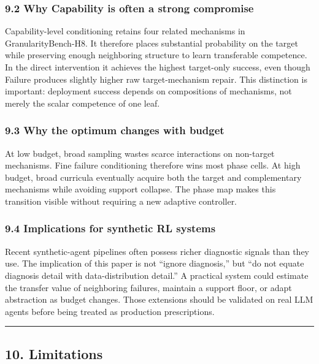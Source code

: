 \documentclass[
]{article}
\begin{document}
\subsubsection{9.2 Why Capability is often a strong
compromise}\label{why-capability-is-often-a-strong-compromise}

Capability-level conditioning retains four related mechanisms in
GranularityBench-H8. It therefore places substantial probability on the
target while preserving enough neighboring structure to learn
transferable competence. In the direct intervention it achieves the
highest target-only success, even though Failure produces slightly
higher raw target-mechanism repair. This distinction is important:
deployment success depends on compositions of mechanisms, not merely the
scalar competence of one leaf.

\subsubsection{9.3 Why the optimum changes with
budget}\label{why-the-optimum-changes-with-budget}

At low budget, broad sampling wastes scarce interactions on non-target
mechanisms. Fine failure conditioning therefore wins most phase cells.
At high budget, broad curricula eventually acquire both the target and
complementary mechanisms while avoiding support collapse. The phase map
makes this transition visible without requiring a new adaptive
controller.

\subsubsection{9.4 Implications for synthetic RL
systems}\label{implications-for-synthetic-rl-systems}

Recent synthetic-agent pipelines often possess richer diagnostic signals
than they use. The implication of this paper is not ``ignore
diagnosis,'' but ``do not equate diagnosis detail with data-distribution
detail.'' A practical system could estimate the transfer value of
neighboring failures, maintain a support floor, or adapt abstraction as
budget changes. Those extensions should be validated on real LLM agents
before being treated as production prescriptions.

\begin{center}\rule{0.5\linewidth}{0.5pt}\end{center}

\subsection{10. Limitations}\label{limitations}
\end{document}
